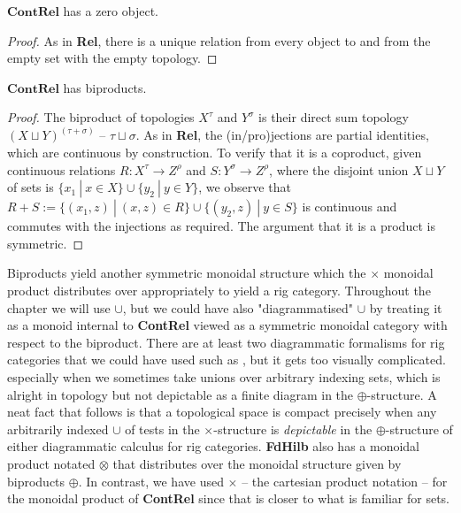 \begin{proposition}
$\mathbf{ContRel}$ has a zero object.
\begin{proof}
As in \textbf{Rel}, there is a unique relation from every object to and from the empty set with the empty topology.
\end{proof}
\end{proposition}

\begin{proposition}
$\mathbf{ContRel}$ has biproducts.
\begin{proof}
The biproduct of topologies $X^\tau$ and $Y^\sigma$ is their direct sum topology $(X \sqcup Y)^{(\tau + \sigma)}$ -- $\tau \sqcup \sigma$. As in \textbf{Rel}, the (in/pro)jections are partial identities, which are continuous by construction. To verify that it is a coproduct, given continuous relations $R: X^\tau \rightarrow Z^\rho$ and $S: Y^\sigma \rightarrow Z^\rho$, where the disjoint union $X \sqcup Y$ of sets is $\{x_1 \ | \ x \in X\} \cup \{y_2 \ | \ y \in Y\}$, we observe that $R + S := \{ (x_1,z) \ | \ (x,z) \in R \} \cup \{ (y_2,z) \ | \ y \in S \}$ is continuous and commutes with the injections as required. The argument that it is a product is symmetric.
\end{proof}
\end{proposition}

\begin{remark}
Biproducts yield another symmetric monoidal structure which the $\times$ monoidal product distributes over appropriately to yield a rig category. Throughout the chapter we will use $\cup$, but we could have also "diagrammatised" $\cup$ by treating it as a monoid internal to \textbf{ContRel} viewed as a symmetric monoidal category with respect to the biproduct. There are at least two diagrammatic formalisms for rig categories that we could have used such as \citep{comfortSheetDiagramsBimonoidal2020}, but it gets too visually complicated. especially when we sometimes take unions over arbitrary indexing sets, which is alright in topology but not depictable as a finite diagram in the $\oplus$-structure. A neat fact that follows is that a topological space is compact precisely when any arbitrarily indexed $\cup$ of tests in the $\times$-structure is \emph{depictable} in the $\oplus$-structure of either diagrammatic calculus for rig categories. \textbf{FdHilb} also has a monoidal product notated $\otimes$ that distributes over the monoidal structure given by biproducts $\oplus$. In contrast, we have used $\times$ -- the cartesian product notation -- for the monoidal product of \textbf{ContRel} since that is closer to what is familiar for sets.
\end{remark}

